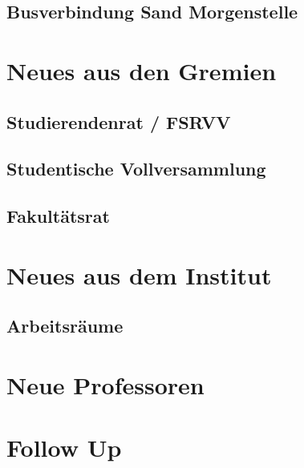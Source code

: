 \documentclass{fsinewsletter}
\begin{document}
\subsection{Busverbindung Sand Morgenstelle}


\newpage
\section{Neues aus den Gremien}


\subsection{Studierendenrat / FSRVV}


\subsection{Studentische Vollversammlung}


\subsection{Fakultätsrat}

\newpage
\section{Neues aus dem Institut}
\subsection{Arbeitsräume}

\newpage
\section{Neue Professoren}


\newpage
\section{Follow Up}

\end{document}
